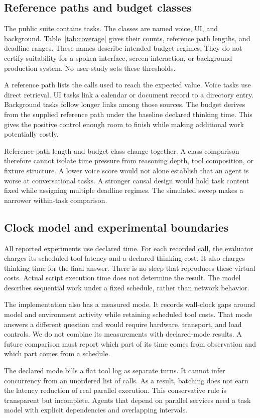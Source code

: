 \documentclass{article}
\begin{document}
\subsection{Reference paths and budget classes}
The public suite contains \TaskCount{} tasks. The classes are named voice, UI, and background. Table~\ref{tab:coverage} gives their counts, reference path lengths, and deadline ranges. These names describe intended budget regimes. They do not certify suitability for a spoken interface, screen interaction, or background production system. No user study sets these thresholds.\par

A reference path lists the calls used to reach the expected value. Voice tasks use direct retrieval. UI tasks link a calendar or document record to a directory entry. Background tasks follow longer links among those sources. The budget derives from the supplied reference path under the baseline declared thinking time. This gives the positive control enough room to finish while making additional work potentially costly.\par
Reference-path length and budget class change together. A class comparison therefore cannot isolate time pressure from reasoning depth, tool composition, or fixture structure. A lower voice score would not alone establish that an agent is worse at conversational tasks. A stronger causal design would hold task content fixed while assigning multiple deadline regimes. The simulated sweep makes a narrower within-task comparison.\par

\subsection{Clock model and experimental boundaries}
All reported experiments use declared time. For each recorded call, the evaluator charges its scheduled tool latency and a declared thinking cost. It also charges thinking time for the final answer. There is no sleep that reproduces these virtual costs. Actual script execution time does not determine the result. The model describes sequential work under a fixed schedule, rather than network behavior.\par
The implementation also has a measured mode. It records wall-clock gaps around model and environment activity while retaining scheduled tool costs. That mode answers a different question and would require hardware, transport, and load controls. We do not combine its measurements with declared-mode results. A future comparison must report which part of its time comes from observation and which part comes from a schedule.\par
The declared mode bills a flat tool log as separate turns. It cannot infer concurrency from an unordered list of calls. As a result, batching does not earn the latency reduction of real parallel execution. This conservative rule is transparent but incomplete. Agents that depend on parallel services need a task model with explicit dependencies and overlapping intervals.\par
\end{document}
